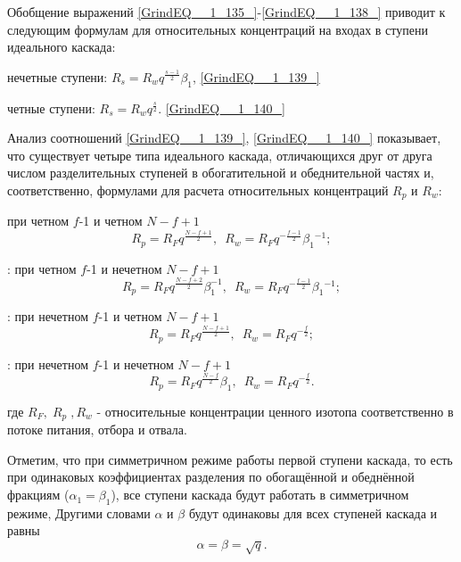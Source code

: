 Обобщение выражений \ref{GrindEQ__1_135_}-\ref{GrindEQ__1_138_} приводит к следующим формулам для относительных концентраций на входах в ступени идеального каскада:

нечетные ступени: $R_{s} =R_{w} q^{\frac{s-1}{2} } \beta _{1} $,                              \ref{GrindEQ__1_139_}

четные ступени:  $R_{s} =R_{w} q^{\frac{s}{2} } $.                                   \ref{GrindEQ__1_140_}

Анализ соотношений \ref{GrindEQ__1_139_}, \ref{GrindEQ__1_140_} показывает, что существует четыре типа идеального каскада, отличающихся друг от друга числом разделительных ступеней в обогатительной и обеднительной частях и, соответственно, формулами для расчета относительных концентраций $R_{p} $ и $R_{w} $:

\textbf{\textit{}}\underbar{:} при четном $f$-1 и четном $N-f+1$
\begin{equation} \label{GrindEQ__1_141_} 
R_{p} =R_{F} q^{\frac{N-f+1}{2} } ,\, \, \, R_{w} =R_{F} q^{-\frac{f-1}{2} } \beta _{1} {}^{-1} ; 
\end{equation} 

\textbf{\textit{}}: при четном $f$-1 и нечетном $N-f+1$
\begin{equation} \label{GrindEQ__1_142_} 
R_{p} =R_{F} q^{\frac{N-f+2}{2} } \beta _{1}^{-1} ,\, \, \, R_{w} =R_{F} q^{-\frac{f-1}{2} } \beta _{1} {}^{-1} ; 
\end{equation} 

\textbf{\textit{}}: при нечетном $f$-1 и четном $N-f+1$
\begin{equation} \label{GrindEQ__1_143_} 
R_{p} =R_{F} q^{\frac{N-f+1}{2} } ,\, \, \, R_{w} =R_{F} q^{-\frac{f}{2} } ; 
\end{equation} 

\textbf{\textit{}}: при нечетном $f$-1 и нечетном $N-f+1$
\begin{equation} \label{GrindEQ__1_144_} 
R_{p} =R_{F} q^{\frac{N-f}{2} } \beta _{1} ,\, \, \, R_{w} =R_{F} q^{-\frac{f}{2} } . 
\end{equation} 

где $R_{F} ,\; R_{p} \; ,R_{w} $ - относительные концентрации ценного изотопа соответственно в потоке питания, отбора и отвала.

 Отметим, что при симметричном режиме работы первой ступени каскада, то есть при одинаковых коэффициентах разделения по обогащённой и обеднённой фракциям ($\alpha _{1} =\beta _{1} $), все ступени каскада будут работать в симметричном режиме, Другими словами $\alpha $ и $\beta $ будут одинаковы для всех ступеней каскада и равны
\begin{equation} \label{GrindEQ__1_145_} 
\alpha =\beta =\sqrt{q} .                                 
\end{equation} 

